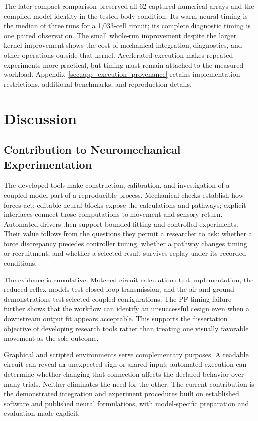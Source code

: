 The later compact comparison preserved all 62 captured numerical arrays and the compiled model identity in the tested body condition. Its warm neural timing is the median of three runs for a 1,033-cell circuit; its complete diagnostic timing is one paired observation. The small whole-run improvement despite the larger kernel improvement shows the cost of mechanical integration, diagnostics, and other operations outside that kernel. Accelerated execution makes repeated experiments more practical, but timing must remain attached to the measured workload. Appendix~\ref{sec:app_execution_provenance} retains implementation restrictions, additional benchmarks, and reproduction details.

\section{Discussion}\label{sec:sns_discussion}

\subsection{Contribution to Neuromechanical Experimentation}

The developed tools make construction, calibration, and investigation of a coupled model part of a reproducible process. Mechanical checks establish how forces act; editable neural blocks expose the calculations and pathways; explicit interfaces connect those computations to movement and sensory return. Automated drivers then support bounded fitting and controlled experiments. Their value follows from the questions they permit a researcher to ask: whether a force discrepancy precedes controller tuning, whether a pathway changes timing or recruitment, and whether a selected result survives replay under its recorded conditions.

The evidence is cumulative. Matched circuit calculations test implementation, the reduced reflex models test closed-loop transmission, and the air and ground demonstrations test selected coupled configurations. The PF timing failure further shows that the workflow can identify an unsuccessful design even when a downstream output fit appears acceptable. This supports the dissertation objective of developing research tools rather than treating one visually favorable movement as the sole outcome.

Graphical and scripted environments serve complementary purposes. A readable circuit can reveal an unexpected sign or shared input; automated execution can determine whether changing that connection affects the declared behavior over many trials. Neither eliminates the need for the other. The current contribution is the demonstrated integration and experiment procedures built on established software and published neural formulations, with model-specific preparation and evaluation made explicit.

